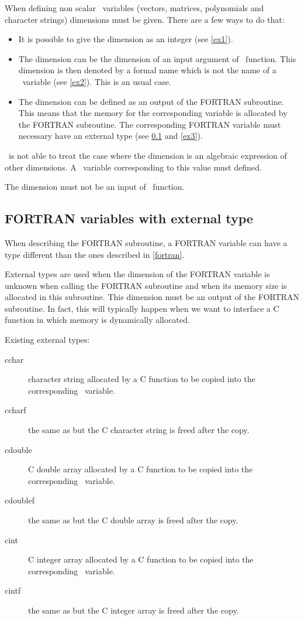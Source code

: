When defining non scalar \SCI\ variables (vectors, matrices, polynomials and
character strings) dimensions must be given. There are a few ways to do that:

\begin{itemize}
  \item It is possible to give the dimension as an integer (see \ref{ex1}).
  \item The dimension can be the dimension of an input argument of \SCI\
function. This dimension is then denoted by a formal name which is not the
name of a \SCI\ variable (see \ref{ex2}). This is an usual case.
  \item The dimension can be defined as an output of the FORTRAN subroutine.
This means that the memory for the corresponding variable is allocated by the
FORTRAN subroutine. The corresponding FORTRAN variable must necessary have an
external type (see \ref{external} and \ref{ex3}).
\end{itemize}

\ISCI\ is not able to treat the case where the dimension is an algebraic
expression of other dimensions. A \SCI\ variable corresponding to this value
must defined.

The dimension must not be an input of \SCI\ function.

\subsection{FORTRAN variables with external type}
\label{external}

When describing the FORTRAN subroutine, a FORTRAN variable can have a type
different than the ones described in \ref{fortran}.

External types are used when the dimension of the FORTRAN variable is
unknown when calling the FORTRAN subroutine and when its memory size is
allocated in this subroutine. This dimension must be an output of the FORTRAN
subroutine. In fact, this will typically happen when we want to interface a C
function in which memory is dynamically allocated.

\smallskip

Existing external types:
\begin{description}
 \item[cchar] character string allocated by a C function to be copied into the
corresponding \SCI\ variable.
 \item[ccharf] the same as  but the C character string is freed after
the copy.
 \item[cdouble] C double array allocated by a C function to be copied into the
corresponding \SCI\ variable.
 \item[cdoublef] the same as  but the C double array is freed after
the copy.
 \item[cint] C integer array allocated by a C function to be copied into the
corresponding \SCI\ variable.
 \item[cintf] the same as  but the C integer array is freed after
the copy.
\end{description}


